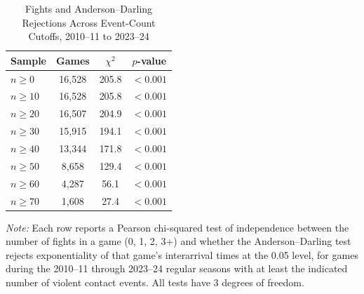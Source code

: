 \begin{table}[htbp]
\centering
\caption{Fights and Anderson--Darling Rejections Across Event-Count Cutoffs, 2010--11 to 2023--24}
\label{tab:fight_vs_AD_rejection_chi_squared_20102011_20232024}
\small
\renewcommand{\arraystretch}{1.12}
\setlength{\tabcolsep}{6pt}

\begin{tabular*}{0.85\textwidth}{@{\extracolsep{\fill}}lccc}
\toprule
Sample & Games & $\chi^2$ & $p$-value \\
\midrule
$n \geq 0$ & 16,528 & 205.8 & $<0.001$ \\
$n \geq 10$ & 16,528 & 205.8 & $<0.001$ \\
$n \geq 20$ & 16,507 & 204.9 & $<0.001$ \\
$n \geq 30$ & 15,915 & 194.1 & $<0.001$ \\
$n \geq 40$ & 13,344 & 171.8 & $<0.001$ \\
$n \geq 50$ & 8,658 & 129.4 & $<0.001$ \\
$n \geq 60$ & 4,287 & 56.1 & $<0.001$ \\
$n \geq 70$ & 1,608 & 27.4 & $<0.001$ \\
\bottomrule
\end{tabular*}

\vspace{0.4em}
\parbox{0.85\textwidth}{
\footnotesize
\textit{Note:} Each row reports a Pearson chi-squared test of independence between the number of fights in a game (0, 1, 2, 3+) and whether the Anderson--Darling test rejects exponentiality of that game's interarrival times at the 0.05 level, for games during the 2010--11 through 2023--24 regular seasons with at least the indicated number of violent contact events. All tests have 3 degrees of freedom. 
}
\end{table}
